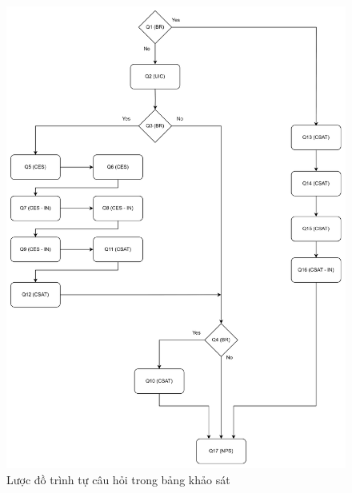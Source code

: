 \begin{figure}[H]
    \centering
    \includegraphics[width = \linewidth]{Content/Cơ sở lý thuyết/documents/Survey/images/surveyflow.png}
    \vspace{0.5cm}
    \caption{Lược đồ trình tự câu hỏi trong bảng khảo sát}
    \label{fig:Lược đồ trình tự câu hỏi trong bảng khảo sát}
\end{figure}